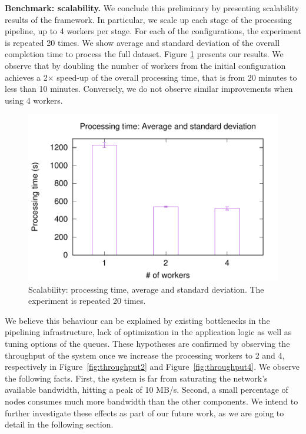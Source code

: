 \textbf{Benchmark: scalability.} We conclude this preliminary by presenting scalability results of the \SYS framework.
In particular, we scale up each stage of the processing pipeline, up to 4 workers per stage.
For each of the configurations, the experiment is repeated 20 times.
We show average and standard deviation of the overall completion time to process the full dataset.
Figure \ref{fig:scalability} presents our results.
We observe that by doubling the number of workers from the initial configuration achieves a 2$\times$ speed-up of the overall processing time, that is from 20 minutes to less than 10 minutes.
Conversely, we do not observe similar improvements when using 4 workers.

\begin{figure}[t!]
  \centering
  \includegraphics[scale=0.5]{images/avg_stdev_4_streams}
  \caption{Scalability: processing time, average and standard deviation. The experiment is repeated 20 times.}
  \label{fig:scalability}
\end{figure}

We believe this behaviour can be explained by existing bottlenecks in the pipelining infrastructure, lack of optimization in the application logic as well as tuning options of the \zmq queues. 
These hypotheses are confirmed by observing the throughput of the system once we increase the processing workers to 2 and 4, respectively in Figure~\ref{fig:throughput2} and Figure~\ref{fig:throughput4}.
We observe the following facts.
First, the system is far from saturating the network's available bandwidth, hitting a peak of 10 MB/s.
Second, a small percentage of nodes consumes much more bandwidth than the other components.
We intend to further investigate these effects as part of our future work, as we are going to detail in the following section.

